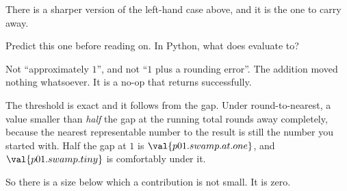\begin{fr}
There is a sharper version of the left-hand case above, and it is the one to
carry away.

Predict this one before reading on. In Python, what does
 evaluate to?
\nextframe
\end{fr}

\begin{fr}
Not \enquote{approximately $1$}, and not \enquote{$1$ plus a rounding error}.
The addition moved nothing whatsoever. It is a no-op that returns successfully.

The threshold is exact and it follows from the gap. Under round-to-nearest, a
value smaller than \emph{half} the gap at the running total rounds away
completely, because the nearest representable number to the result is still
the number you started with. Half the gap at $1$ is $\val{p01.swamp.at.one}$,
and $\val{p01.swamp.tiny}$ is comfortably under it.

So there is a size below which a contribution is not small. It is zero.
\end{fr}

